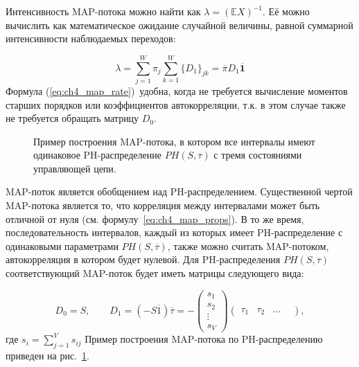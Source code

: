 Интенсивность MAP-потока можно найти как $\lambda = (\mathbb{E}X)^{-1}$. Её можно вычислить как математическое ожидание случайной величины, равной суммарной интенсивности наблюдаемых переходов:

\begin{equation}
	\label{eq:ch4_map_rate}
	\lambda = \sum\limits_{j=1}^{W} \pi_j \sum\limits_{k=1}^{W} \{D_1\}_{jk} = \overline{\pi} D_1 \overline{\mathbf{1}}
\end{equation}
Формула (\ref{eq:ch4_map_rate})~удобна, когда не требуется вычисление моментов старших порядков или коэффициентов автокорреляции, т.к. в этом случае также не требуется обращать матрицу $D_0$.

\begin{figure}[h]
    \caption{Пример построения MAP-потока, в котором все интервалы имеют одинаковое PH-распределение $PH(S, \overline{\tau})$ с тремя состояниями управляющей цепи.
    \label{fig:ch4_ph2map}}
\end{figure}

MAP-поток является обобщением над PH-распределением. Существенной чертой MAP-потока является то, что корреляция между интервалами может быть отличной от нуля (см. формулу~\eqref{eq:ch4_map_props}). В то же время, последовательность интервалов, каждый из которых имеет PH-распределение с одинаковыми параметрами $PH(S, \overline{\tau})$, также можно считать MAP-потоком, автокорреляция в котором будет нулевой. Для PH-распределения $PH(S, \overline{\tau})$ соответствующий MAP-поток будет иметь матрицы следующего вида:

\begin{equation}
    \label{eq:ch4_map_ph_representation}
    D_0 = S, \qquad D_1 = (-S \overline{1}) \overline{\tau} = -\left(
        \begin{matrix}
            s_1\\
            s_2\\
            \vdots\\
            s_V
        \end{matrix}
     \right) \left(
         \begin{matrix}
            \tau_1 & \tau_2 & \dots &
         \end{matrix}
     \right),
\end{equation}
где $s_i = \sum_{j=1}^V s_{ij}$
Пример построения MAP-потока по PH-распределению приведен на рис.~\ref{fig:ch4_ph2map}.



